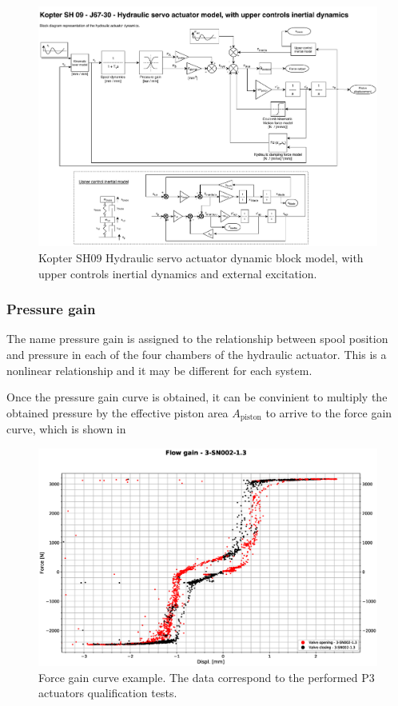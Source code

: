   \begin{figure}[!htpb]
    \centering
    \includegraphics[width=0.9 \textwidth]{figures/modelActuator}
    \caption[Dynamic block model of the hydraulic actuator]{Kopter SH09 Hydraulic servo actuator dynamic block model, with upper controls inertial dynamics and external excitation.}
    \label{fig:modelActuator}
  \end{figure}

  \subsubsection{Pressure gain}

    The name pressure gain is assigned to the relationship between spool position and pressure in each of the four chambers of the hydraulic actuator. This is a nonlinear relationship and it may be different for each system.

    Once the pressure gain curve is obtained, it can be convinient to multiply the obtained pressure by the effective piston area $A_{\mathrm{piston}}$ to arrive to the force gain curve, which is shown in 

    \begin{figure}[!htpb]
      \centering
      \includegraphics[width=0.9 \textwidth]{figures/flow_gain_example}
      \caption[Force gain curve example]{Force gain curve example. The data correspond to the performed P3 actuators qualification tests.}
      \label{fig:flow_gain_example}
    \end{figure}

